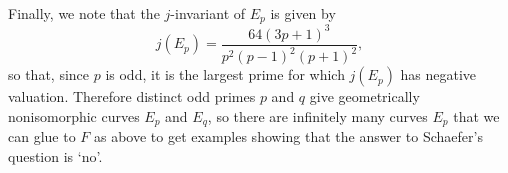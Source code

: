 \documentclass{amsart}
\theoremstyle{remark}
\begin{document}
Finally, we note that the $j$-invariant of $E_p$ is given by
\[
j(E_p) = \frac{64 (3 p + 1)^3}{p^2 (p-1)^2 (p+1)^2},
\]
so that, since $p$ is odd, it is the largest prime for which $j(E_p)$ has
negative valuation.  Therefore distinct odd primes $p$ and $q$ give 
geometrically nonisomorphic curves $E_p$ and $E_q$, so there are infinitely 
many curves $E_p$ that we can glue to $F$ as above to get examples showing that
the answer to Schaefer's question is `no'.

 

\end{document}
